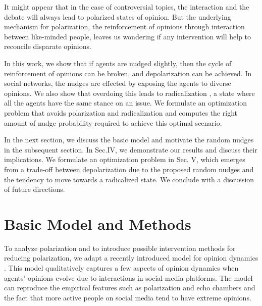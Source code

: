 \documentclass[%
 reprint,
superscriptaddress,
 amsmath,amssymb,
 aps,
 pre,
]{revtex4-1}
\begin{document}
It might appear that in the case of controversial topics, the interaction and the debate will always lead to polarized states of opinion. But the underlying mechanism for polarization, the reinforcement of opinions through interaction between like-minded people, leaves us wondering if any intervention will help to reconcile disparate opinions.

In this work, we show that if agents are nudged slightly, then the cycle of reinforcement of opinions can be broken, and depolarization can be achieved. In social networks, the nudges are effected by exposing the agents to diverse opinions. We also show that overdoing this leads to radicalization \cite{the-group-polarization-phemomenon, group-polarization-a-critical-review-and-meta-analysis}, a state where all the agents have the same stance on an issue. We formulate an optimization problem that avoids polarization and radicalization and computes the right amount of nudge probability required to achieve this optimal scenario.

In the next section, we discuss the basic model and motivate the random nudges in the subsequent section. In Sec.IV, we demonstrate our results and discuss their implications. We formulate an optimization problem in Sec. V, which emerges from a trade-off between depolarization due to the proposed random nudges and the tendency to move towards a radicalized state. We conclude with a discussion of future directions.     


\section{Basic Model and Methods}
To analyze polarization and to introduce possible intervention methods for reducing polarization, we adapt a recently introduced model for opinion dynamics \cite{modeling-echo-chambers-and-polarizaiton-dynamics-in-social-networks}. This model qualitatively captures a few aspects of opinion dynamics when agents' opinions evolve due to interactions in social media platforms. The model can reproduce the empirical features such as polarization and echo chambers and the fact that more active people on social media tend to have extreme opinions. 
\end{document}
